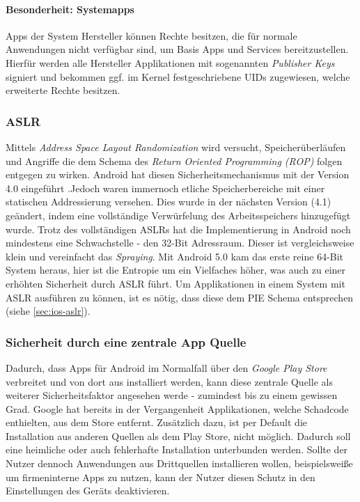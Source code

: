 	\paragraph{Besonderheit: Systemapps}
	Apps der System Hersteller können Rechte besitzen, die für normale Anwendungen nicht verfügbar sind, um Basis Apps und Services bereitzustellen. Hierfür werden alle Hersteller Applikationen mit sogenannten \textit{Publisher Keys} signiert und bekommen ggf. im Kernel festgeschriebene UIDs zugewiesen, welche erweiterte Rechte besitzen.
	
	\subsubsection{ASLR}
	Mittels \textit{Address Space Layout Randomization} wird versucht, Speicherüberläufen und Angriffe die dem Schema des \textit{Return Oriented Programming (ROP)} folgen entgegen zu wirken. Android hat diesen Sicherheitsmechanismus mit der Version 4.0 eingeführt \cite{AslrAndroid}.Jedoch waren immernoch etliche Speicherbereiche mit einer statischen Addressierung versehen. Dies wurde in der nächsten Version (4.1) geändert, indem eine vollständige Verwürfelung des Arbeitsspeichers hinzugefügt wurde\cite{BetterAslrAndroid}. Trotz des vollständigen ASLRs hat die Implementierung in Android noch mindestens eine Schwachstelle - den 32-Bit Adressraum\cite{AslrAndroid32}. Dieser ist vergleichsweise klein und vereinfacht das \textit{Spraying}. Mit Android 5.0 kam das erste reine 64-Bit System heraus, hier ist die Entropie um ein Vielfaches höher, was auch zu einer erhöhten Sicherheit durch ASLR führt. Um Applikationen in einem System mit ASLR ausführen zu können, ist es nötig, dass diese dem PIE Schema entsprechen (siehe \ref{sec:ios-aslr}).
	
	
	\subsubsection{Sicherheit durch eine zentrale App Quelle}
	Dadurch, dass Apps für Android im Normalfall über den \textit{Google Play Store} verbreitet und von dort aus installiert werden, kann diese zentrale Quelle als weiterer Sicherheitsfaktor angesehen werde - zumindest bis zu einem gewissen Grad. Google hat bereits in der Vergangenheit Applikationen, welche Schadcode enthielten, aus dem Store entfernt. Zusätzlich dazu, ist per Default die Installation aus anderen Quellen als dem Play Store, nicht möglich. Dadurch soll eine heimliche oder auch fehlerhafte Installation unterbunden werden. Sollte der Nutzer dennoch Anwendungen aus Drittquellen installieren wollen, beispielsweiße um firmeninterne Apps zu nutzen, kann der Nutzer diesen Schutz in den Einstellungen des Geräts deaktivieren.
